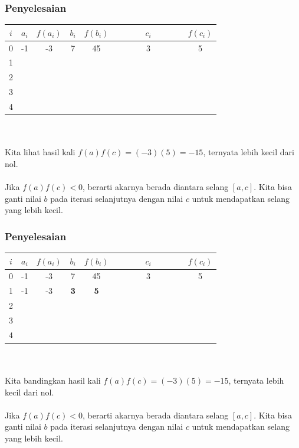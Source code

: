 \documentclass{beamer}
\begin{document}

\begin{frame}
\frametitle{Penyelesaian}
\begin{tabular}{|c|c|c|c|c|c|c|}
\hline
	$i$ & $a_i$ & $f(a_i)$ & $b_i$ & $f(b_i)$ & $c_i$ & $f(c_i)$\\
\hline
	0 & -1 & -3 & 7 & 45 & $\qquad\quad\ $ 3 $\qquad\quad\ $  & 5\\
\hline
	1 &  &  &  &  &  & \\
\hline
	2 &  &  &  &  &  & \\
\hline
	3 &  &  &  &  &  & \\
\hline
	4 &  &  &  &  &  & \\
\hline
\end{tabular}
\\\ \\Kita lihat hasil kali $f(a)f(c) = (-3)(5) = -15$, ternyata lebih kecil dari nol. \\\ \\Jika $f(a)f(c)<0$, berarti akarnya berada diantara selang $[a,c]$. Kita bisa ganti nilai $b$ pada iterasi selanjutnya dengan nilai $c$ untuk mendapatkan selang yang lebih kecil. 
\end{frame}


\begin{frame}
\frametitle{Penyelesaian}
\begin{tabular}{|c|c|c|c|c|c|c|}
\hline
	$i$ & $a_i$ & $f(a_i)$ & $b_i$ & $f(b_i)$ & $c_i$ & $f(c_i)$\\
\hline
	0 & -1 & -3 & 7 & 45 & $\qquad\quad\ $ 3 $\qquad\quad\ $  & 5\\
\hline
	1 & -1 & -3 & \textbf{3} & \textbf{5} &  & \\
\hline
	2 &  &  &  &  &  & \\
\hline
	3 &  &  &  &  &  & \\
\hline
	4 &  &  &  &  &  & \\
\hline
\end{tabular}
\\\ \\Kita bandingkan hasil kali $f(a)f(c) = (-3)(5) = -15$, ternyata lebih kecil dari nol. \\\ \\Jika $f(a)f(c)<0$, berarti akarnya berada diantara selang $[a,c]$. Kita bisa ganti nilai $b$ pada iterasi selanjutnya dengan nilai $c$ untuk mendapatkan selang yang lebih kecil. 
\end{frame}
\end{document}
